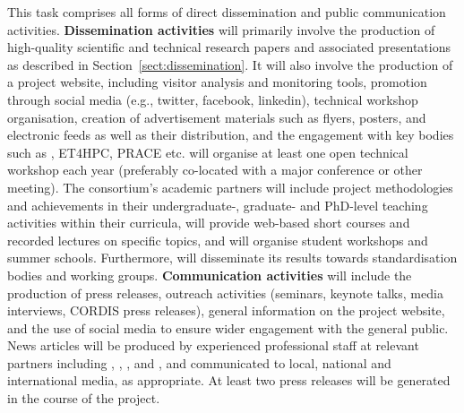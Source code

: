 \begin{Workpackage}{\thewpno}
\begin{Task}

\TaskHeader{}


This task comprises all forms of direct dissemination and public communication activities.
%
\textbf{Dissemination activities} will primarily involve the production of high-quality scientific and technical research papers and associated presentations as described in Section~\ref{sect:dissemination}.
It will also involve the production of a project website, including visitor analysis and monitoring tools, promotion through social media (e.g., twitter, facebook, linkedin), technical workshop organisation, creation of advertisement materials such as flyers, posters, and electronic feeds as well as their distribution, and the engagement with key bodies such as \hipeac, ET4HPC, PRACE etc.
\TheProject{} will organise at least one open technical workshop each year
(preferably co-located with a major conference or other meeting).
The consortium's academic partners will include project methodologies and achievements in their undergraduate-, graduate- and PhD-level teaching activities within their curricula, will provide web-based short courses and recorded lectures on specific \TheProject topics, and will organise student workshops and summer schools.
Furthermore, \TheProject will disseminate its results towards standardisation bodies and working groups.
%
\textbf{Communication activities} will include the production of press releases, outreach activities (seminars, keynote talks, media interviews, CORDIS press releases), general information on the project website, and the use of social media to ensure wider engagement with the general public.
News articles will be produced by experienced professional staff at relevant partners including \SAshort, \IBMshort,  \PRLshort, \SCCHshort and \INRIAshort, and communicated to local, national and international media, as appropriate.
At least two press releases will be generated in the course of the project.
\end{Task}

\begin{Task}


\end{Task}
\end{Workpackage}
